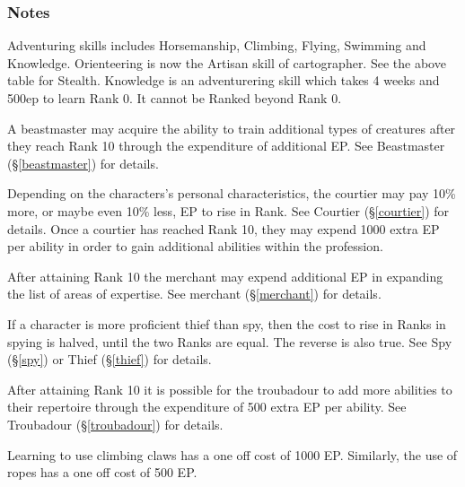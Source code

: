 \begin{multicols}{2}
\subsubsection{Notes}

{\setlength\leftmargini{0pt}
\begin{description}
\setlength\itemsep{0pt}
\item[A] Adventuring skills includes Horsemanship, Climbing, Flying,
Swimming and Knowledge.  Orienteering is now the Artisan skill of
cartographer.  See the above table for Stealth.  Knowledge is an
adventurering skill which takes 4 weeks and 500ep to learn Rank 0.  It
cannot be Ranked beyond Rank 0.

\item[B] A beastmaster may acquire the ability to train additional
types of creatures after they reach Rank 10 through the expenditure of
additional EP.  See Beastmaster (\S\ref{beastmaster}) for details.

\item[C] Depending on the characters's personal characteristics, the
courtier may pay 10\% more, or maybe even 10\% less, EP to rise in
Rank.  See Courtier (\S\ref{courtier}) for details.  Once a courtier
has reached Rank 10, they may expend 1000 extra EP per ability in
order to gain additional abilities within the profession.

\item[D] After attaining Rank 10 the merchant may expend additional EP
in expanding the list of areas of expertise.  See merchant
(\S\ref{merchant}) for details.

\item[E] If a character is more proficient thief than spy, then the
cost to rise in Ranks in spying is halved, until the two Ranks are
equal.  The reverse is also true.  See Spy (\S\ref{spy}) or Thief
(\S\ref{thief}) for details.

\item[F] After attaining Rank 10 it is possible for the troubadour to
add more abilities to their repertoire through the expenditure of 500
extra EP per ability.  See Troubadour (\S\ref{troubadour}) for
details.

\item[G] Learning to use climbing claws has a one off cost of 1000 EP.
Similarly, the use of ropes has a one off cost of 500 EP.

\end{description}}


\end{multicols}
